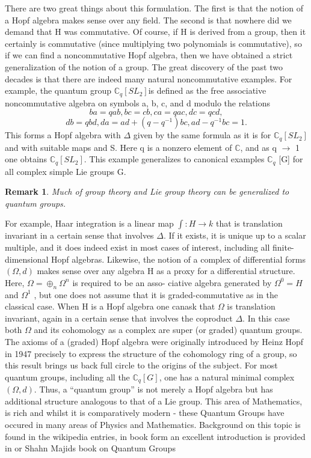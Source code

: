 \documentclass[preprint, 5p, 10pt]{elsarticle}
\theoremstyle{plain}
\newtheorem{remark}[theorem]{Remark}
\begin{document}
There are two great things about this formulation.
The first is that the notion of a Hopf algebra makes
sense over any field. The second is that nowhere did
we demand that H was commutative. Of course, if H is
derived from a group, then it certainly is commutative
(since multiplying two polynomials is commutative), so
if we can find a noncommutative Hopf algebra, then we
have obtained a strict generalization of the notion of
a group. The great discovery of the past two decades
is that there are indeed many natural noncommutative
examples. For example, the quantum group $\mathbb{C}_{q} [SL_{2} ] $is defined
as the free associative noncommutative algebra on
symbols a, b, c, and d modulo the relations
\begin{displaymath}
ba = qab, bc = cb, ca = qac, dc = qcd,
\end{displaymath}
\begin{displaymath}
db = qbd, da = ad + (q − q^{−1} )bc, ad − q^{−1} bc = 1.
\end{displaymath}
This forms a Hopf algebra with $\Delta$ given by the same
formula as it is for $\mathbb{C}_{q} [SL_{2} ] $ and with suitable maps and
S. Here q is a nonzero element of $\mathbb{C}$, and as q $\rightarrow$ 1 one
obtains $\mathbb{C}_{q} [SL_{2} ] $. This example generalizes to canonical
examples $\mathbb{C}_{q}$ [G] for all complex simple Lie groups G.
\begin{remark}
Much of group theory and Lie group theory can be
generalized to quantum groups. 
\end{remark} 
For example, Haar integration is a linear map $\int: H \rightarrow k$ that is translation
invariant in a certain sense that involves $\Delta$. If it exists,
it is unique up to a scalar multiple, and it does indeed
exist in most cases of interest, including all finite-
dimensional Hopf algebras. Likewise, the notion of a
complex of differential forms $(\Omega, d)$ makes
sense over any algebra H as a proxy for a differential
structure. Here, $\Omega = \oplus_{n} \Omega ^{n}$ is required to be an asso-
ciative algebra generated by $\Omega^{0} = H$ and $\Omega ^{1}$ , but one
does not assume that it is graded-commutative as in
the classical case. When H is a Hopf algebra one canask that $\Omega$ is translation invariant, again in a certain
sense that involves the coproduct $\Delta$. In this case both $\Omega$
and its cohomology as a complex are super
(or graded) quantum groups. The axioms of a (graded) Hopf algebra were originally introduced by Heinz Hopf
in 1947 precisely to express the structure of the cohomology ring of a group, so this result brings us back
full circle to the origins of the subject. For most quantum groups, including all the $\mathbb{C}_{q} [G]$, one has a natural minimal complex $(\Omega, d)$. Thus, a “quantum group” is not merely a Hopf algebra but has additional structure
analogous to that of a Lie group.
 This area of Mathematics, is rich and whilst it is comparatively modern - these Quantum Groups have occured in many 
areas of Physics and Mathematics. Background on this topic is found in the wikipedia entries, in book form an excellent introduction 
is provided in \cite{Princeton} or Shahn Majids book on Quantum Groups \cite{QuantumGroups}
\end{document}
